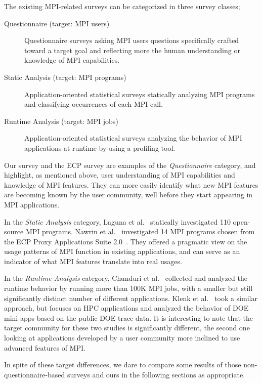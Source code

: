 \documentclass[preprint,5p,times]{elsarticle}
\begin{document}
{
The existing MPI-related surveys can be categorized in three survey classes;
%
\begin{description}
\item[Questionnaire (target: MPI users)] Questionnaire surveys asking MPI
  users questions specifically crafted toward a target goal and
  reflecting more the human understanding or knowledge of MPI
  capabilities.
  \item[Static Analysis (target: MPI programs)] Application-oriented statistical surveys
    statically analyzing MPI programs and classifying occurrences of
    each MPI call.
  \item[Runtime Analysis (target: MPI jobs)] Application-oriented statistical surveys
    analyzing the behavior of MPI applications at runtime by using a
    profiling tool.
\end{description}

Our survey and the ECP survey are examples of the {\it Questionnaire} category,
and highlight, as mentioned above, user understanding of MPI
capabilities and knowledge of MPI features. They can more easily
identify what new MPI features are becoming known by the user
community, well before they start appearing in MPI applications.

In the {\it Static Analysis} category, Laguna et
al.~\cite{10.1145/3295500.3356176} statically investigated
110 open-source MPI programs. Nawrin et al.~\cite{cpe-5901}
investigated 14 MPI programs chosen from the ECP Proxy Applications Suite
2.0~\cite{osti-1482870}. They offered a pragmatic view on the usage patterns of
MPI function in existing applications, and can serve as an indicator of what MPI
features translate into real usages.

In the {\it Runtime Analysis} category, Chunduri et al.~\cite{8665758}
collected and analyzed the runtime behavior by running more than 100K
MPI jobs, with a smaller but still significantly distinct number of
different applications. Klenk et
al.~\cite{10.1007/978-3-319-58667-0-12} took a similar approach, but
focuses on HPC applications and analyzed the behavior of DOE
mini-apps based on the public DOE trace data. It is
interesting to note that the target community for these
two studies is significantly different, the second one
looking at applications developed by a user community more inclined to
use advanced features of MPI.

In spite of these target differences, we dare to compare some results
of those non-questionnaire-based surveys and ours in the
following sections as appropriate.}
\end{document}
